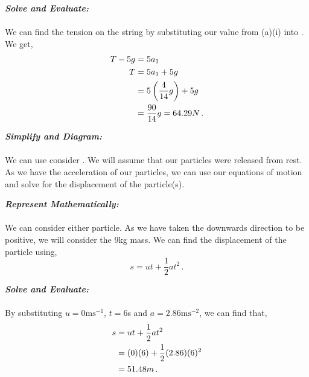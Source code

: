 \begin{subquestions}
\begin{subsubquestions}

\subsubquestion

\textbf{\textit{Solve and Evaluate:}} \\ \\
We can find the tension on the string by substituting our value from (a)(i) into . We get,
\begin{align}
	T-5g & = 5a_1 \nonumber \\
	T & = 5a_1 + 5g \nonumber \\
	  & = 5\left(\frac{4}{14}g \right) + 5g \nonumber \\
	  & = \frac{90}{14}g = 64.29N \,.
\end{align}


\subsubquestion

\textbf{\textit{Simplify and Diagram:}} \\ \\
We can use consider . We will assume that our particles were released from rest. As we have the acceleration of our particles, we can use our equations of motion and solve for the displacement of the particle(s).




\textbf{\textit{Represent Mathematically:}} \\ \\
We can consider either particle. As we have taken the downwards direction to be positive, we will consider the 9kg mass. We can find the displacement of the particle using,
\begin{equation}
	s=ut+\frac{1}{2}at^2 \,.
\end{equation}




\textbf{\textit{Solve and Evaluate:}} \\ \\
By substituting $u=0\text{ms}^{-1}$, $t=6$s and $a=2.86\text{ms}^{-2}$, we can find that,
\begin{align}
	s & = ut+\frac{1}{2}at^2 \nonumber \\
	  & = (0)(6) + \frac{1}{2}(2.86)(6)^2 \nonumber \\
	  & = 51.48m \,.
\end{align}

\end{subsubquestions}


\end{subquestions}
